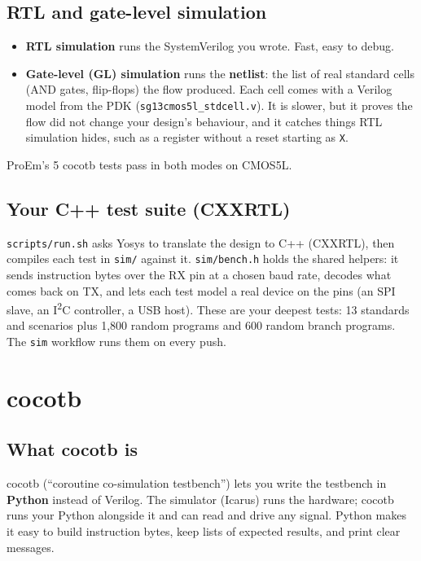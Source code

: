 \documentclass[11pt,a4paper]{article}
\newcommand{\file}[1]{\texttt{#1}}
\newcommand{\cmd}[1]{\texttt{#1}}
\begin{document}
\subsection{RTL and gate-level simulation}

\begin{itemize}
\item \textbf{RTL simulation} runs the SystemVerilog you wrote. Fast, easy to debug.
\item \textbf{Gate-level (GL) simulation} runs the \textbf{netlist}: the list of real standard cells (AND gates, flip-flops) the flow produced. Each cell comes with a Verilog model from the PDK (\file{sg13cmos5l\_stdcell.v}). It is slower, but it proves the flow did not change your design's behaviour, and it catches things RTL simulation hides, such as a register without a reset starting as \texttt{X}.
\end{itemize}

ProEm's 5 cocotb tests pass in both modes on CMOS5L.

\subsection{Your C++ test suite (CXXRTL)}\label{sec:cxxrtl}

\file{scripts/run.sh} asks Yosys to translate the design to C++ (CXXRTL), then compiles each test in \file{sim/} against it. \file{sim/bench.h} holds the shared helpers: it sends instruction bytes over the RX pin at a chosen baud rate, decodes what comes back on TX, and lets each test model a real device on the pins (an SPI slave, an I\textsuperscript{2}C controller, a USB host). These are your deepest tests: 13 standards and scenarios plus 1,800 random programs and 600 random branch programs. The \cmd{sim} workflow runs them on every push.

\section{cocotb}\label{sec:cocotb}

\subsection{What cocotb is}

cocotb (``coroutine co-simulation testbench'') lets you write the testbench in \textbf{Python} instead of Verilog. The simulator (Icarus) runs the hardware; cocotb runs your Python alongside it and can read and drive any signal. Python makes it easy to build instruction bytes, keep lists of expected results, and print clear messages.
\end{document}
